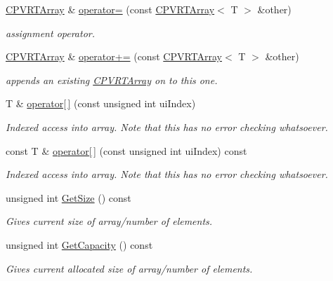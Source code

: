 \begin{DoxyCompactItemize}
\hyperlink{class_c_p_v_r_t_array}{C\+P\+V\+R\+T\+Array} \& \hyperlink{class_c_p_v_r_t_array_ae50baa98b3516507fe93d364b2d61b12}{operator=} (const \hyperlink{class_c_p_v_r_t_array}{C\+P\+V\+R\+T\+Array}$<$ T $>$ \&other)
\begin{DoxyCompactList}\small\item\em assignment operator. \end{DoxyCompactList}\item 
\hyperlink{class_c_p_v_r_t_array}{C\+P\+V\+R\+T\+Array} \& \hyperlink{class_c_p_v_r_t_array_ac6a16f26d3591b2016bc3fcff4b621d8}{operator+=} (const \hyperlink{class_c_p_v_r_t_array}{C\+P\+V\+R\+T\+Array}$<$ T $>$ \&other)
\begin{DoxyCompactList}\small\item\em appends an existing \hyperlink{class_c_p_v_r_t_array}{C\+P\+V\+R\+T\+Array} on to this one. \end{DoxyCompactList}\item 
T \& \hyperlink{class_c_p_v_r_t_array_a265910f8a2d0d9136c67f31f8afed9a6}{operator\mbox{[}$\,$\mbox{]}} (const unsigned int ui\+Index)
\begin{DoxyCompactList}\small\item\em Indexed access into array. Note that this has no error checking whatsoever. \end{DoxyCompactList}\item 
const T \& \hyperlink{class_c_p_v_r_t_array_a24aa3d87c50596e9402906969873b4c3}{operator\mbox{[}$\,$\mbox{]}} (const unsigned int ui\+Index) const 
\begin{DoxyCompactList}\small\item\em Indexed access into array. Note that this has no error checking whatsoever. \end{DoxyCompactList}\item 
unsigned int \hyperlink{class_c_p_v_r_t_array_a7f441650618876cd84adaad282a83ac1}{Get\+Size} () const 
\begin{DoxyCompactList}\small\item\em Gives current size of array/number of elements. \end{DoxyCompactList}\item 
unsigned int \hyperlink{class_c_p_v_r_t_array_a0b5535925d0a7e18bca921525206f31d}{Get\+Capacity} () const 
\begin{DoxyCompactList}\small\item\em Gives current allocated size of array/number of elements. \end{DoxyCompactList}\item 

\end{DoxyCompactItemize}
